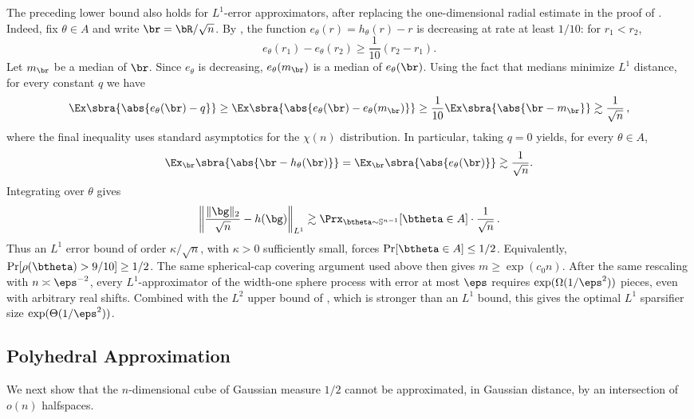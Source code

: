 \documentclass[11pt]{article}
\renewcommand{\S}{\mathbb{S}}
\begin{document}
\begin{remark}
\label{rem:l1-sphere-lb}
The preceding lower bound also holds for $L^1$-error approximators, after replacing the one-dimensional radial estimate in the proof of .  
Indeed, fix $\theta\in A$ and write $\br=\bR/\sqrt n$.  
By , the function $e_\theta(r)=h_\theta(r)-r$ is decreasing at rate at least $1/10$: for $r_1<r_2$,
\[
    e_\theta(r_1)-e_\theta(r_2)
    \geq
    \frac{1}{10}(r_2-r_1).
\]
Let $m_{\br}$ be a median of $\br$. 
Since $e_\theta$ is decreasing, $e_\theta(m_{\br})$ is a median of $e_\theta(\br)$. 
Using the fact that medians minimize $L^1$ distance, for every constant $q$ we have 
\[
    \Ex\sbra{\abs{e_\theta(\br)-q}}
    \geq
    \Ex\sbra{\abs{e_\theta(\br)-e_\theta(m_{\br})}}
    \geq
    \frac{1}{10}\Ex\sbra{\abs{\br-m_{\br}}}
    \gtrsim 
    \frac{1}{\sqrt n}\,,
\]
where the final inequality uses standard asymptotics for the $\chi(n)$ distribution.  
In particular, taking $q=0$ yields, for every $\theta\in A$,
\[
    \Ex_{\br}\sbra{\abs{\br-h_\theta(\br)}}
    =
    \Ex_{\br}\sbra{\abs{e_\theta(\br)}}
    \gtrsim
    \frac{1}{\sqrt n}.
\]
Integrating over $\theta$ gives
\[
    \left\|
        \frac{\|\bg\|_2}{\sqrt n}-h(\bg)
    \right\|_{L^1}
    \gtrsim
    \Prx_{\btheta\sim\S^{n-1}}[\btheta\in A]\cdot \frac{1}{\sqrt n}\,.
\]
Thus an $L^1$ error bound of order $\kappa/\sqrt n$, with $\kappa>0$ sufficiently small, forces $\Pr[\btheta\in A]\leq 1/2$.
Equivalently, $\Pr[\rho(\btheta) > 9/10]  \geq 1/2$. 
The same spherical-cap covering argument used above then gives $m\geq \exp(c_0 n)$. 
After the same rescaling with $n\asymp \eps^{-2}$, every $L^1$-approximator of the width-one sphere process with error at most $\eps$ requires $\exp(\Omega(1/\eps^2))$ pieces, even with arbitrary real shifts. 
Combined with the $L^2$ upper bound of , which is stronger than an $L^1$ bound, this gives the optimal $L^1$ sparsifier size $\exp(\Theta(1/\eps^2))$.
\end{remark}

\subsection{Polyhedral Approximation}
\label{subsec:polytope-lb}

We next show that the $n$-dimensional cube of Gaussian measure $1/2$ cannot be approximated, in Gaussian distance, by an intersection of $o(n)$ halfspaces. 

\cubepolytopelb*
\end{document}
